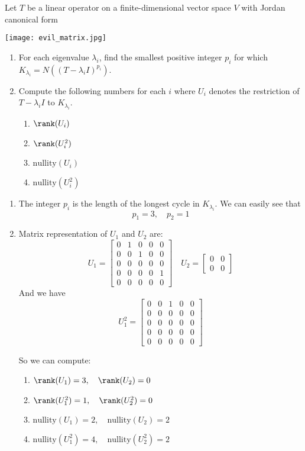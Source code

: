 \begin{homeworkProblem}

Let $T$ be a linear operator on a finite-dimensional vector space $V$ with Jordan canonical form

\texttt{[image: evil\_matrix.jpg]}

\begin{enumerate}
  \item For each eigenvalue $\lambda_i$, find the smallest positive integer $p_i$ for which $K_{\lambda_i} = N((T-\lambda_i I)^{p_i})$.
  \item Compute the following numbers for each $i$ where $U_i$ denotes the restriction of $T-\lambda_i I$ to $K_{\lambda_i}$.
  \begin{enumerate}
    \item $\rank(U_i)$
    \item $\rank(U_i^2)$
    \item $\mathrm{nullity}(U_i)$
    \item $\mathrm{nullity}(U_i^2)$
  \end{enumerate}
\end{enumerate}

\solution

\begin{enumerate}
  \item The integer $p_i$ is the length of the longest cycle in $K_{\lambda_i}$. We can easily see that
\[ p_1 = 3, \quad p_2 = 1\]
\item Matrix representation of $U_1$ and $U_2$ are:
\[
  U_1 = \begin{bmatrix}
    0 & 1 & 0 & 0 & 0\\
    0 & 0 & 1 & 0 &0 \\
    0 & 0 & 0 & 0 & 0 \\
    0 & 0 & 0 & 0 & 1 \\
    0 & 0 & 0 & 0 & 0
    \end{bmatrix} \quad
  U_2 = \begin{bmatrix}
    0 & 0 \\
    0 & 0
    \end{bmatrix}
\]
And we have
\[
  U_1^2 = \begin{bmatrix}
  0 & 0 & 1 & 0 & 0\\
  0 & 0 & 0 & 0 &0 \\
  0 & 0 & 0 & 0 & 0 \\
  0 & 0 & 0 & 0 & 0 \\
  0 & 0 & 0 & 0 & 0
  \end{bmatrix}
  \]

So we can compute:
\begin{enumerate}
  \item $\rank(U_1) = 3, \quad \rank(U_2) = 0$
  \item $\rank(U_1^2) = 1, \quad \rank(U_2^2) = 0$
  \item $\mathrm{nullity}(U_1) = 2, \quad \mathrm{nullity}(U_2) = 2$
  \item $\mathrm{nullity}(U_1^2) = 4, \quad \mathrm{nullity}(U_2^2) = 2$
\end{enumerate}
\end{enumerate}
\end{homeworkProblem}
